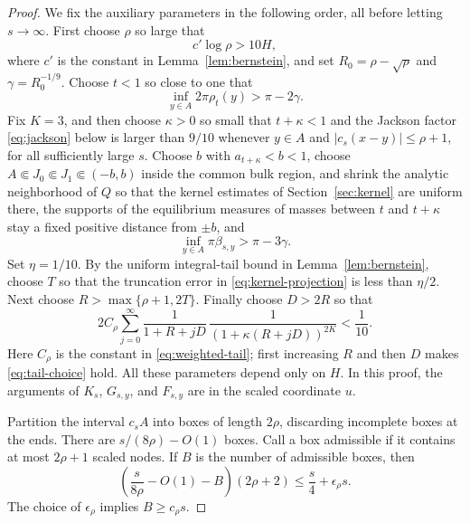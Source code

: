 \documentclass[11pt]{article}
\theoremstyle{definition}
\numberwithin{equation}{section}
\begin{document}
\begin{proof}
We fix the auxiliary parameters in the following order, all before
letting \(s\to\infty\). First choose \(\rho\) so large that
\[
 c'\log\rho>10H,
\]
where \(c'\) is the constant in Lemma~\ref{lem:bernstein}, and set
\(R_0=\rho-\sqrt\rho\) and \(\gamma=R_0^{-1/9}\). Choose \(t<1\)
so close to one that
\[
 \inf_{y\in A}2\pi\rho_t(y)>\pi-2\gamma.
\]
Fix \(K=3\), and then choose \(\kappa>0\) so small that
\(t+\kappa<1\) and the Jackson factor \eqref{eq:jackson} below is
larger than \(9/10\) whenever \(y\in A\) and
\(|c_s(x-y)|\le\rho+1\), for all sufficiently large \(s\). Choose
\(b\) with \(a_{t+\kappa}<b<1\), choose
\(A\Subset J_0\Subset J_1\Subset(-b,b)\) inside the common bulk
region, and shrink the analytic neighborhood of \(Q\) so that the
kernel estimates of Section~\ref{sec:kernel} are uniform there, the
supports of the equilibrium measures of masses between \(t\) and
\(t+\kappa\) stay a fixed positive distance from \(\pm b\), and
\begin{equation}\label{eq:bandwidth-margin}
 \inf_{y\in A}\pi\beta_{s,y}>\pi-3\gamma.
\end{equation}
Set \(\eta=1/10\). By the uniform integral-tail bound in
Lemma~\ref{lem:bernstein}, choose \(T\) so that the truncation error
in \eqref{eq:kernel-projection} is less than \(\eta/2\). Next choose
\(R>\max\{\rho+1,2T\}\). Finally choose \(D>2R\) so that
\begin{equation}\label{eq:tail-choice}
 2C_\rho\sum_{j=0}^{\infty}
 \frac{1}{1+R+jD}\,
 \frac{1}{(1+\kappa(R+jD))^{2K}}<\frac1{10}.
\end{equation}
Here \(C_\rho\) is the constant in \eqref{eq:weighted-tail}; first
increasing \(R\) and then \(D\) makes \eqref{eq:tail-choice} hold.
All these parameters depend only on \(H\). In this proof, the
arguments of \(K_s\), \(G_{s,y}\), and \(F_{s,y}\) are in the scaled
coordinate \(u\).

Partition the interval \(c_sA\) into boxes of length \(2\rho\),
discarding incomplete boxes at the ends.
There are \(s/(8\rho)-O(1)\) boxes.
Call a box admissible if it contains at most \(2\rho+1\) scaled nodes.
If \(B\) is the number of admissible boxes, then
\[
 \left(\frac{s}{8\rho}-O(1)-B\right)(2\rho+2)
 \le \frac{s}{4}+\epsilon_\rho s.
\]
The choice of \(\epsilon_\rho\) implies \(B\ge c_\rho s\).


\end{proof}
\end{document}
